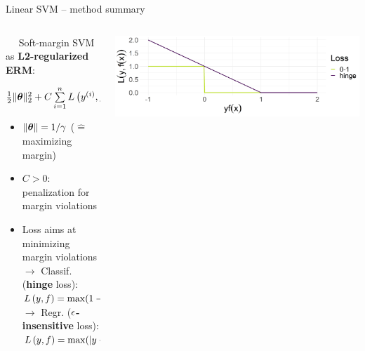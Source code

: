 \begin{vbframe}{Linear SVM -- method summary}
\begin{columns}[T, totalwidth = \textwidth]
\begin{column}{0.59\textwidth}
 ~~ Soft-margin SVM as \textbf{L2-regularized ERM}: 
     \centerline{$\frac{1}{2} \|\bm{\theta}\|_2^2 + C \sum\limits_{i=1}^n L\left(y^{(i)}, f\left(\mathbf{x}^{(i)}\right)\right)$}
     \vspace{-\topsep}
  \begin{itemize}
  \setlength{\parskip}{0pt} 
  \setlength{\itemsep}{0pt plus 1pt}
    \item $\|\bm{\theta}\| = 1 / \gamma$ ($\hat{=}$ maximizing margin) \\
    \item $C > 0$: penalization for margin violations
    \item Loss aims at minimizing margin violations\\
    $\rightarrow$ Classif. (\textbf{hinge} loss): $L\left(y, f\right) = \max(1-yf, 0)$ \\
    $\rightarrow$ Regr. (\textbf{$\epsilon$-insensitive} loss):   $L\left(y, f\right) = \max(|y-f| - \epsilon, 0)$ 
  \end{itemize}
\vspace{-\topsep}
\end{column}
\begin{column}{0.4\textwidth}
  \centering
  \includegraphics[height=\textwidth, keepaspectratio=true]{
  figure/plot_loss_hinge.png}

\end{column}
\end{columns}
\end{vbframe}
